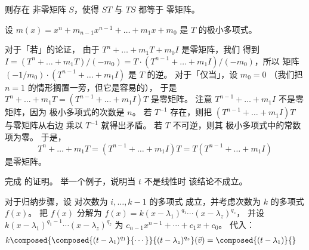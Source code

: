 \begin{exercises}
\begin{exparts}
       则存在
       非零矩阵 \( S \)，使得 \( ST \) 与 \( TS \) 都等于
       零矩阵。
     \end{exparts}
     \begin{answer}
      设 \( m(x)=x^n+m_{n-1}x^{n-1}+\dots+m_1x+m_0 \)
      是 \( T \) 的极小多项式。
      \begin{exparts}
       \partsitem 
         对于「若」的论证， 
         由于 \( T^n+\dots+m_1T+m_0I \) 是零矩阵，我们
         得到 \( I=(T^n+\dots+m_1T)/(-m_0)=
         T\cdot (T^{n-1}+\dots+m_1I)/(-m_0) \)，所以 
         矩阵 $(-1/m_0)\cdot (T^{n-1}+\dots+m_1I)$ 是 $T$ 的逆。
         对于「仅当」，设 \( m_0=0 \) 
         （我们把 \( n=1 \) 的情形搁置一旁，但它是容易的），
         于是
         \( T^n+\dots+m_1T=(T^{n-1}+\dots+m_1I)T \) 是零矩阵。
         注意 \( T^{n-1}+\dots+m_1I \) 不是零矩阵，因为
         极小多项式的次数是 \( n \)。
         若 \( T^{-1} \) 存在，则把
         \( (T^{n-1}+\dots+m_1I)T \) 与零矩阵从右边
         乘以 $T^{-1}$ 就得出矛盾。
       \partsitem 若 \( T \) 不可逆，则其
         极小多项式中的常数项为零。
         于是，
         \begin{equation*}
            T^n+\dots+m_1T=(T^{n-1}+\dots+m_1I)T=T(T^{n-1}+\dots+m_1I)
         \end{equation*}
         是零矩阵。
       \end{exparts} 
     \end{answer}
   \recommended \item \label{exer:PolyMapsFactor}
      \begin{exparts}
        \partsitem 完成  的证明。
        \partsitem 举一个例子，说明当 $t$ 不是线性时
          该结论不成立。
      \end{exparts}
      \begin{answer}
        \begin{exparts}
          \partsitem
            对于归纳步骤，设 
            对次数为 \( i,\ldots,k-1 \) 的多项式
            成立，并考虑次数为 \( k \) 的多项式 \( f(x) \)。 
            把 $f(x)$ 分解为 $f(x)=k(x-\lambda_1)^{q_1}\cdots(x-\lambda_z)^{q_z}$，
            并设
            \( k(x-\lambda_1)^{q_1-1}\cdots(x-\lambda_z)^{q_z} \)
            为 \( c_{n-1}x^{n-1}+\cdots+c_1x+c_0 \)。
            代入：
            \begin{align*}
               k\composed{\composed{(t-\lambda_1)^{q_1}}{\cdots}}{
                                            (t-\lambda_z)^{q_z}}(\vec{v})
               &=
               \composed{(t-\lambda_1)}{
}
\end{align*}
\end{exparts}
\end{answer}
\end{exercises}
